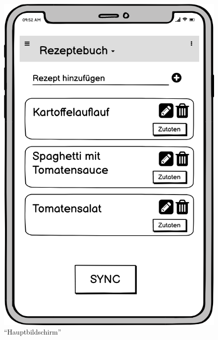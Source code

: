 \documentclass[a4paper, 12pt]{scrreprt}
\begin{document}
\begin{figure}
	\centering
	\begin{minipage}{.45\textwidth}
		\centering
		\includegraphics[width=1\textwidth]{wireframeRezepte2.png}
		\caption{\enquote{Hauptbildschirm}}
		\label{fig:rezepteFrame}
	\end{minipage}
	\begin{minipage}{.45\textwidth}
		\centering

\end{minipage}
\end{figure}
\end{document}
